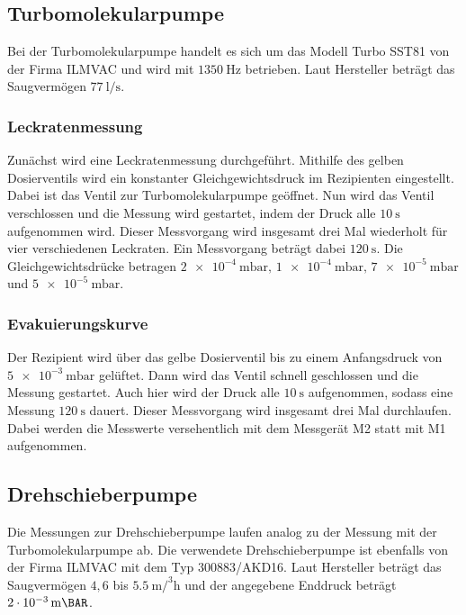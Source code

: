         \subsection{Turbomolekularpumpe}
            Bei der Turbomolekularpumpe handelt es sich um das Modell Turbo SST81 von der Firma ILMVAC und wird mit $\SI{1350}{\hertz}$ betrieben.
            Laut Hersteller beträgt das Saugvermögen $\SI{77}{\litre\per\second}$.

            \subsubsection{Leckratenmessung}
                Zunächst wird eine Leckratenmessung durchgeführt.
                Mithilfe des gelben Dosierventils wird ein konstanter Gleichgewichtsdruck im Rezipienten eingestellt.
                Dabei ist das Ventil zur Turbomolekularpumpe geöffnet.
                Nun wird das Ventil verschlossen und die Messung wird gestartet, indem der Druck alle $\SI{10}{\second}$ aufgenommen wird.
                Dieser Messvorgang wird insgesamt drei Mal wiederholt für vier verschiedenen Leckraten.
                Ein Messvorgang beträgt dabei $\SI{120}{\second}$.
                Die Gleichgewichtsdrücke betragen $\SI{2e-4}{\milli\bar}, \, \SI{1e-4}{\milli\bar}, \, \SI{7e-5}{\milli\bar}$ und $\SI{5e-5}{\milli\bar}$.

            \subsubsection{Evakuierungskurve}
                Der Rezipient wird über das gelbe Dosierventil bis zu einem Anfangsdruck von $\SI{5e-3}{\milli\bar}$ gelüftet.
                Dann wird das Ventil schnell geschlossen und die Messung gestartet.
                Auch hier wird der Druck alle $\SI{10}{\second}$ aufgenommen, sodass eine Messung $\SI{120}{\second}$ dauert.
                Dieser Messvorgang wird insgesamt drei Mal durchlaufen.
                Dabei werden die Messwerte versehentlich mit dem Messgerät M2 statt mit M1 aufgenommen.

        \subsection{Drehschieberpumpe}
            Die Messungen zur Drehschieberpumpe laufen analog zu der Messung mit der Turbomolekularpumpe ab.
            Die verwendete Drehschieberpumpe ist ebenfalls von der Firma ILMVAC mit dem Typ 300883/AKD16.
            Laut Hersteller beträgt das Saugvermögen $4,6$ bis $\SI{5.5}{\metre\cubic\per\hour}$ und der angegebene Enddruck beträgt $\SI{2e-3}{\milli\BAR}$.

